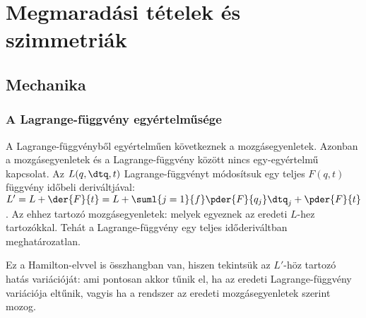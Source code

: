 \chapter{Megmarad\'asi t\'etelek \'es szimmetri\'ak}\label{ss:A04}
 
 \section{Mechanika}

  \subsection{A Lagrange-függvény egyértelműsége}
   
   A Lagrange-függvényből egyértelműen következnek a mozgásegyenletek.
   Azonban a mozgásegyenletek és a Lagrange-függvény között nincs egy-egyértelmű kapcsolat.
   Az $L(q,\dtq,t)$ Lagrange-függvényt módosítsuk egy teljes  $F(q,t)$ függvény időbeli deriváltjával: $L'=L+\der{F}{t}=L+\suml{j=1}{f}\pder{F}{q_j}\dtq_j+\pder{F}{t}$.
   Az ehhez tartozó mozgásegyenletek:
   melyek egyeznek az eredeti $L$-hez tartozókkal.
   Tehát a Lagrange-függvény egy teljes időderiváltban meghatározatlan.
   
   Ez a Hamilton-elvvel is összhangban van, hiszen tekintsük az $L'$-höz tartozó hatás variációját:
   ami pontosan akkor tűnik el, ha az eredeti Lagrange-függvény variációja eltűnik, vagyis ha a rendszer az eredeti mozgásegyenletek szerint mozog.

